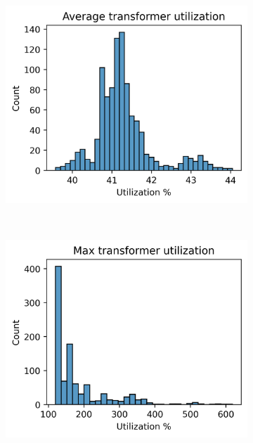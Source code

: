 \begin{figure}[H]
\begin{subfigure}{.33\textwidth}
      \caption{}
      \label{fig:appendix:urban2:histograms:max_cable}
    \end{subfigure}
    \begin{subfigure}{.33\textwidth}
        \centering
        \includegraphics[width=\linewidth]{img/switchstate_exploring/urban2/histograms/avg_trafo_util.png}
        \caption{}
        \label{fig:appendix:urban2:histograms:avg_trafo}
      \end{subfigure}\\
      \begin{subfigure}{.33\textwidth}
        \centering
        \includegraphics[width=\linewidth]{img/switchstate_exploring/urban2/histograms/max_trafo_util.png}

\end{subfigure}
\end{figure}
